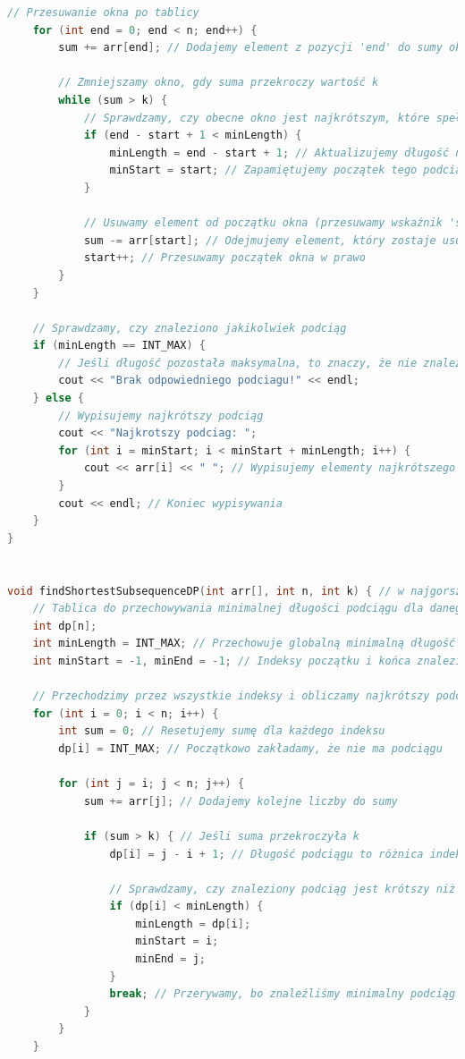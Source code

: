 \documentclass[12pt,twoside]{article}
\begin{document}
\begin{lstlisting}[language=C++, caption={main.cpp}, label={lst:program}]
    // Przesuwanie okna po tablicy
    for (int end = 0; end < n; end++) {
        sum += arr[end]; // Dodajemy element z pozycji 'end' do sumy okna

        // Zmniejszamy okno, gdy suma przekroczy wartość k
        while (sum > k) {
            // Sprawdzamy, czy obecne okno jest najkrótszym, które spełnia warunek
            if (end - start + 1 < minLength) {
                minLength = end - start + 1; // Aktualizujemy długość najkrótszego podciągu
                minStart = start; // Zapamiętujemy początek tego podciągu
            }

            // Usuwamy element od początku okna (przesuwamy wskaźnik 'start' w prawo)
            sum -= arr[start]; // Odejmujemy element, który zostaje usunięty z okna
            start++; // Przesuwamy początek okna w prawo
        }
    }

    // Sprawdzamy, czy znaleziono jakikolwiek podciąg
    if (minLength == INT_MAX) {
        // Jeśli długość pozostała maksymalna, to znaczy, że nie znaleziono podciągu
        cout << "Brak odpowiedniego podciagu!" << endl;
    } else {
        // Wypisujemy najkrótszy podciąg
        cout << "Najkrotszy podciag: ";
        for (int i = minStart; i < minStart + minLength; i++) {
            cout << arr[i] << " "; // Wypisujemy elementy najkrótszego podciągu
        }
        cout << endl; // Koniec wypisywania
    }
}


void findShortestSubsequenceDP(int arr[], int n, int k) { // w najgorszym przypadku O(n^2)
    // Tablica do przechowywania minimalnej długości podciągu dla danego indeksu
    int dp[n];  
    int minLength = INT_MAX; // Przechowuje globalną minimalną długość podciągu spełniającego warunek
    int minStart = -1, minEnd = -1; // Indeksy początku i końca znalezionego podciągu

    // Przechodzimy przez wszystkie indeksy i obliczamy najkrótszy podciąg
    for (int i = 0; i < n; i++) {
        int sum = 0; // Resetujemy sumę dla każdego indeksu
        dp[i] = INT_MAX; // Początkowo zakładamy, że nie ma podciągu

        for (int j = i; j < n; j++) {
            sum += arr[j]; // Dodajemy kolejne liczby do sumy

            if (sum > k) { // Jeśli suma przekroczyła k
                dp[i] = j - i + 1; // Długość podciągu to różnica indeksów + 1
                
                // Sprawdzamy, czy znaleziony podciąg jest krótszy niż poprzednie
                if (dp[i] < minLength) {
                    minLength = dp[i];
                    minStart = i;
                    minEnd = j;
                }
                break; // Przerywamy, bo znaleźliśmy minimalny podciąg dla tego i
            }
        }
    }


\end{lstlisting}
\end{document}
